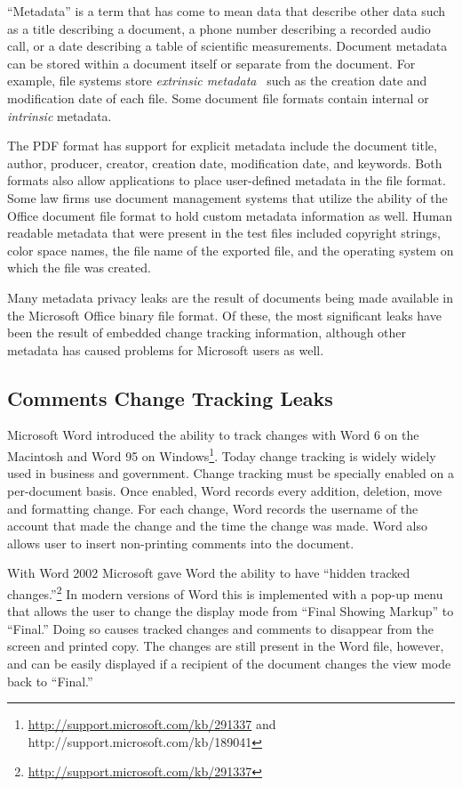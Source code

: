 \documentclass{article}
\begin{document}
``Metadata'' is a term that has come to mean data that describe other
data such as a title describing a document, a phone number describing
a recorded audio call, or a date describing a table of scientific measurements. Document metadata can be stored within a document itself
or separate from the document. For example, file systems store
\emph{extrinsic metadata}~\cite{garfinkel:ascription} such as the
creation date and modification date of each file. Some document file
formats contain internal or \emph{intrinsic} metadata. 

The PDF format has support for explicit metadata include the document
title, author, producer, creator, creation date, modification date,
and keywords. Both formats also allow applications to place
user-defined metadata in the file format. Some law firms use document
management systems that utilize the ability of the Office document
file format to hold custom metadata information as well. Human
readable metadata that were present in the test files included
copyright strings, color space names, the file name of the exported
file, and the operating system on which the file was created.

Many metadata privacy leaks are the result of
documents being made available in the  Microsoft Office binary file
format. Of these, the most significant leaks have been the result of
embedded change tracking information, although other metadata has
caused problems for Microsoft users as well.


\subsection{Comments Change Tracking Leaks}

Microsoft Word introduced the ability to track changes with Word 6 on
the Macintosh and Word 95 on
Windows\footnote{\url{http://support.microsoft.com/kb/291337}
  and http://support.microsoft.com/kb/189041}. Today change
tracking is widely widely used in business and government. Change
tracking must be specially enabled on a per-document basis. Once
enabled, Word records every addition, deletion, move and formatting
change. For each change, Word records the username of the account that
made the change and the time the change was made. Word also allows
user to insert non-printing comments into the document.

With Word 2002 Microsoft gave Word the ability to have ``hidden
tracked
changes.''\footnote{\url{http://support.microsoft.com/kb/291337}} In
modern versions of Word this is implemented with a pop-up menu that
allows the user to change the display mode from ``Final Showing
Markup'' to ``Final.'' Doing so causes tracked changes and comments to
disappear from the screen and printed copy. The changes are still
present in the Word file, however, and can be easily displayed if a
recipient of the document  changes the view mode back to ``Final.''
\end{document}
